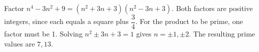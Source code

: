 Factor $n^4-3n^2+9=(n^2+3n+3)(n^2-3n+3)$. Both factors are positive integers, since each equals a square plus $\dfrac{3}{4}$. For the product to be prime, one factor must be 1. Solving $n^2\pm3n+3=1$ gives $n=\pm1,\pm2$. The resulting prime values are $\boxed{7,13}$.
